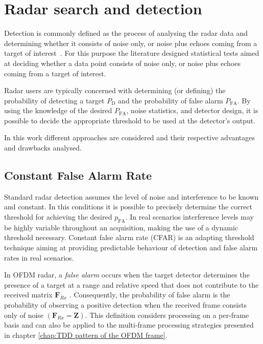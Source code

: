 
	\section{Radar search and detection}
	\label{sec:radar_search_detection}
		Detection is commonly defined as the process of analysing the radar data and determining whether it consists of noise only, or noise plus echoes coming from a target of interest~\cite{Richards_Scheer_Holm_2010}. 
		For this purpose the literature designed statistical tests aimed at deciding whether a data point consists of noise only, or noise plus echoes coming from a target of interest.
		
		Radar users are typically concerned with determining (or defining) the probability of detecting a target $P_\text{D}$ and the probability of false alarm $P_\text{{FA}}$.  By using the knowledge of the desired $P_\text{{FA}}$, noise statistics, and detector design, it is possible to decide the appropriate threshold to be used at the detector's output.
		
		In this work different approaches are considered and their respective advantages and drawbacks analysed. 



		\subsection{Constant False Alarm Rate}
	
				Standard radar detection assumes the level of noise and interference to be known and constant. In this conditions it is possible to precisely determine the correct threshold for achieving the desired $	p_\text{FA}$. In real scenarios interference levels may be highly variable throughout an acquisition, making the use of a dynamic threshold necessary. Constant false alarm rate (CFAR) is an adapting threshold technique aiming at providing predictable behaviour of detection and false alarm rates in real scenarios.
				
				
				In OFDM radar, a \textit{false alarm} occurs when the target detector determines the presence of a target at a range and relative speed that does not contribute to the received matrix $\mathbf F_{Rx}$ \cite{Braun2014OFDMRA}. 
				Consequently, the probability of false alarm is the probability of observing a positive detection when the received frame consists only of noise $(\mathbf F_{Rx} = \mathbf Z)$. 
				This definition considers processing on a per-frame basis and can also be applied to the multi-frame processing strategies presented in chapter \ref{chap:TDD pattern of the OFDM frame}. 
				
